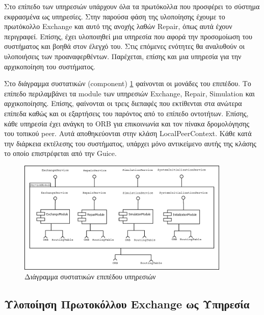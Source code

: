 Στο επίπεδο των υπηρεσιών υπάρχουν όλα τα πρωτόκολλα που 
προσφέρει το σύστημα εκφρασμένα ως υπηρεσίες. Στην παρούσα φάση της 
υλοποίησης έχουμε το πρωτόκολλο Exchange και αυτό της ανοχής λαθών 
Repair, όπως αυτά έχουν περιγραφεί. Επίσης, έχει υλοποιηθεί μια υπηρεσία 
που αφορά την προσομοίωση του συστήματος και βοηθά στον έλεγχό του. Στις 
επόμενες ενότητες θα αναλυθούν οι υλοποιήσεις των προαναφερθέντων. 
Παρέχεται, επίσης και μια υπηρεσία για την αρχικοποίηση του συστήματος.

Στο διάγραμμα συστατικών (component) \ref{fig:ServiceComponents} 
φαίνονται οι μονάδες του επιπέδου. Το επίπεδο περιλαμβάνει τα module 
των υπηρεσιών Exchange, Repair, Simulation και αρχικοποίησης. Επίσης, 
φαίνονται οι τρεις διεπαφές που εκτίθενται στα ανώτερα επίπεδα καθώς και 
οι εξαρτήσεις του παρόντος από το επίπεδο οντοτήτων. Επίσης, κάθε υπηρεσία 
έχει ανάγκη το ORB για επικοινωνία και τον πίνακα δρομολόγησης του τοπικού 
peer. Αυτά αποθηκεύονται στην κλάση LocalPeerContext. Κάθε κατά την διάρκεια 
εκτέλεσης του συστήματος, υπάρχει μόνο αντικείμενο αυτής της κλάσης το 
οποίο επιστρέφεται από την Guice.

\begin{figure}[htbp]
  \begin{center}
    \includegraphics[width=0.9\textwidth]{Figures/Architecture/Service_Layer/Service_ComponentDiagram.png}
  \end{center}
  \caption{Διάγραμμα συστατικών επιπέδου υπηρεσιών}
  \label{fig:ServiceComponents}
\end{figure}

\subsection{Υλοποίηση Πρωτοκόλλου Exchange ως Υπηρεσία}

